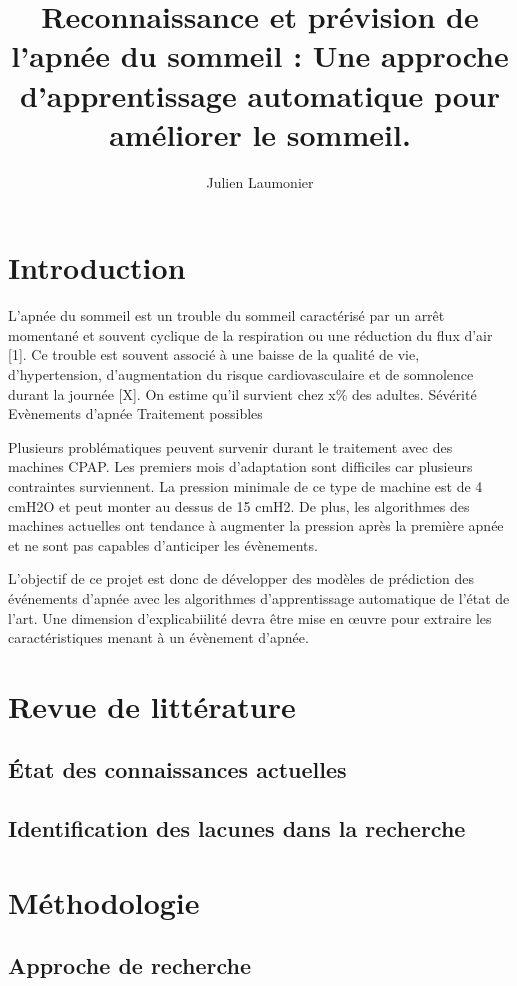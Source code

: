 \documentclass{article}
\title{Reconnaissance et prévision de l'apnée du sommeil : Une approche d'apprentissage automatique pour améliorer le sommeil. }
\author{Julien Laumonier}
\begin{document}
    \maketitle

    \section{Introduction}

L’apnée du sommeil est un trouble du sommeil caractérisé par un arrêt momentané et souvent cyclique de la respiration ou une réduction du flux d’air [1]. Ce trouble est souvent associé à une baisse de la qualité de vie, d'hypertension, d’augmentation du risque cardiovasculaire et de somnolence durant la journée [X]. On estime qu’il survient chez x\% des adultes.
Sévérité
Evènements d’apnée
Traitement possibles

Plusieurs problématiques peuvent survenir durant le traitement avec des machines CPAP. Les premiers mois d’adaptation sont difficiles car plusieurs contraintes surviennent. La pression minimale de ce type de machine est de 4 cmH2O et peut monter au dessus de 15 cmH2. De plus, les algorithmes des machines actuelles ont tendance à augmenter la pression après la première apnée et ne sont pas capables d’anticiper les évènements.

L’objectif de ce projet est donc de développer des modèles de prédiction des événements d’apnée avec les algorithmes d’apprentissage automatique de l’état de l’art. Une dimension d’explicabiilité devra être mise en œuvre pour extraire les caractéristiques menant à un évènement d’apnée.

    \section{Revue de littérature}
    \subsection{État des connaissances actuelles}
    \subsection{Identification des lacunes dans la recherche}

    \section{ Méthodologie}
    \subsection{Approche de recherche}
\end{document}
